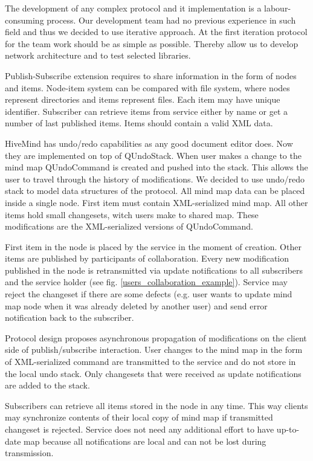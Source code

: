  The development of any complex protocol and it implementation is a
 labour-consuming process. Our development team had no previous experience in
 such field and thus we decided to use iterative approach. At the first iteration
 protocol for the team work should be as simple as possible. Thereby allow us to
 develop network architecture and to test selected libraries.

 Publish-Subscribe extension requires to share information in the form of nodes
 and items. Node-item system can be compared with file system, where nodes
 represent directories and items represent files. Each item may have unique
 identifier. Subscriber can retrieve items from service either by name or get a
 number of last published items. Items should contain a valid XML data.

 HiveMind has undo/redo capabilities as any good document editor does. Now they
 are implemented on top of QUndoStack. When user makes a change to the mind map
 QUndoCommand is created and pushed into the stack. This allows the user to
 travel through the history of modifications. We decided to use undo/redo stack
 to model data structures of the protocol. All mind map data can be placed
 inside a single node. First item must contain XML-serialized mind map. All other
 items hold small changesets, witch users make to shared map. These modifications
 are the XML-serialized versions of QUndoCommand.

 First item in the node is placed by the service in the moment of creation. Other
 items are published by participants of collaboration. Every new modification
 published in the node is retransmitted via update notifications to all
 subscribers and the service holder (see fig. \ref{users_collaboration_example}). 
 Service may reject the changeset if there are some defects (e.g. user wants to 
 update mind map node when it was already deleted by another user) and send error
 notification back to the subscriber.

 Protocol design proposes asynchronous propagation of modifications on the client
 side of publish/subscribe interaction. User changes to the mind map in the form
 of XML-serialized command are transmitted to the service and do not store in
 the local undo stack. Only changesets that were received as update notifications
 are added to the stack.

 Subscribers can retrieve all items stored in the node in any time. This
 way clients may synchronize contents of their local copy of mind map if
 transmitted changeset is rejected. Service does not need any additional effort
 to have up-to-date map because all notifications are local and can not be lost
 during transmission.

